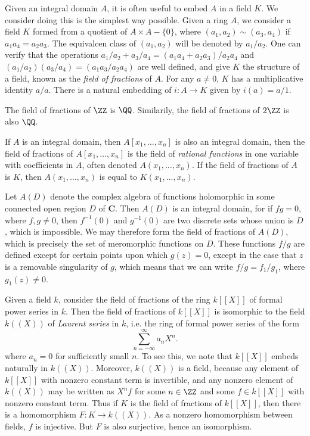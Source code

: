 Given an integral domain $A$, it is often useful to embed $A$ in a field $K$. We consider doing this is the simplest way possible. Given a ring $A$, we consider a field $K$ formed from a quotient of $A \times A - \{ 0 \}$, where $(a_1,a_2) \sim (a_3,a_4)$ if $a_1a_4 = a_2a_3$. The equivalcen class of $(a_1,a_2)$ will be denoted by $a_1/a_2$. One can verify that the operations $a_1/a_2 + a_3/a_4 = (a_1a_4 + a_2a_3)/a_2a_4$ and $(a_1/a_2)(a_3/a_4) = (a_1a_3/a_2a_4)$ are well defined, and give $K$ the structure of a field, known as the \emph{field of fractions} of $A$. For any $a \neq 0$, $K$ has a multiplicative identity $a/a$. There is a natural embedding of $i: A \to K$ given by $i(a) = a/1$.

\begin{example}
    The field of fractions of $\ZZ$ is $\QQ$. Similarily, the field of fractions of $2\ZZ$ is also $\QQ$.
\end{example}

\begin{example}
    If $A$ is an integral domain, then $A[x_1,\dots,x_n]$ is also an integral domain, then the field of fractions of $A[x_1,\dots,x_n]$ is the field of \emph{rational functions} in one variable with coefficients in $A$, often denoted $A(x_1,\dots,x_n)$. If the field of fractions of $A$ is $K$, then $A(x_1,\dots,x_n)$ is equal to $K(x_1,\dots,x_n)$.
\end{example}

\begin{example}
    Let $A(D)$ denote the complex algebra of functions holomorphic in some connected open region $D$ of $\mathbf{C}$. Then $A(D)$ is an integral domain, for if $fg = 0$, where $f,g \neq 0$, then $f^{-1}(0)$ and $g^{-1}(0)$ are two discrete sets whose union is $D$, which is impossible. We may therefore form the field of fractions of $A(D)$, which is precisely the set of meromorphic functions on $D$. These functions $f/g$ are defined except for certain points upon which $g(z) = 0$, except in the case that $z$ is a removable singularity of $g$, which means that we can write $f/g = f_1/g_1$, where $g_1(z) \neq 0$.
\end{example}

\begin{example}
    Given a field $k$, consider the field of fractions of the ring $k[[X]]$ of formal power series in $k$. Then the field of fractions of $k[[X]]$ is isomorphic to the field $k((X))$ of \emph{Laurent series} in $k$, i.e. the ring of formal power series of the form
    \[ \sum_{n = -\infty}^\infty a_n X^n. \]
    where $a_n = 0$ for sufficiently small $n$. To see this, we note that $k[[X]]$ embeds naturally in $k((X))$. Moreover, $k((X))$ is a field, because any element of $k[[X]]$ with nonzero constant term is invertible, and any nonzero element of $k((X))$ may be written as $X^n f$ for some $n \in \ZZ$ and some $f \in k[[X]]$ with nonzero constant term. Thus if $K$ is the field of fractions of $k[[X]]$, then there is a homomorphism $F: K \to k((X))$. As a nonzero homomorphism between fields, $f$ is injective. But $F$ is also surjective, hence an isomorphism.
\end{example}

